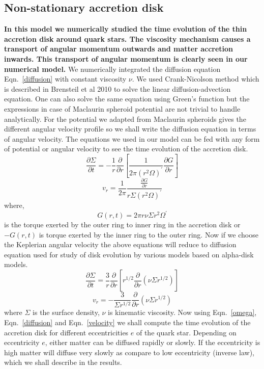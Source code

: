 \documentclass[useAMS,usenatbib]{mn2e}
\begin{document}
\subsection{Non-stationary accretion disk}
\textbf{In this model we numerically studied the time evolution of the thin accretion disk around quark stars. The viscosity mechanism causes a transport of angular momentum outwards and matter accretion inwards. This transport of angular momentum is clearly seen in our numerical model.} We numerically integrated the diffusion equation Eqn.~\ref{diffusion} with constant viscosity $\nu$. We used Crank-Nicolson method which is described in Brensteil et al 2010 to solve the linear diffusion-advection equation. One can also solve the same equation using Green's function but the expressions in case of Maclaurin spheroid potential are not trivial to handle analytically. For the potential we adapted from Maclaurin spheroids gives the different angular velocity profile so we shall write the diffusion equation in terms of angular velocity. The equations we used in our model can be fed with any form of potential or angular velocity to see the time evolution of the accretion disk.
\begin{equation}
\frac{\partial\Sigma}{\partial t} = -\frac{1}{r}\frac{\partial}{\partial r}\left[\frac{1}{2\pi(r^2\Omega)^\prime}\frac{\partial G}{\partial r}\right]
\label{diffusion}
\end{equation}
\begin{equation}
v_r = \frac{1}{2\pi}\frac{\frac{\partial G}{\partial r}}{r\Sigma (r^2\Omega)^\prime}
\label{velocity}
\end{equation}
where,
\begin{equation}
G(r,t) = 2\pi r\nu\Sigma r^2 \Omega^\prime 
\end{equation}
is the torque exerted by the outer ring to inner ring in the accretion disk or $-G(r,t)$ is torque exerted by the inner ring to the outer ring. Now if we choose the Keplerian angular velocity the above equations will reduce to diffusion equation used for study of disk evolution by various models based on alpha-disk models.
\begin{equation}
\frac{\partial\Sigma}{\partial t} = \frac{3}{r}\frac{\partial}{\partial r}\left[r^{1/2}\frac{\partial}{\partial r}\left(\nu\Sigma r^{1/2}\right)\right]
\end{equation}
\begin{equation}
v_r = -\frac{3}{\Sigma r^{1/2}}\frac{\partial}{\partial r}\left(\nu\Sigma r^{1/2}\right)
\end{equation}
where $\Sigma$ is the surface density, $\nu$ is kinematic viscosity. Now using Eqn.~\ref{omega}, Eqn.~\ref{diffusion} and Eqn.~\ref{velocity} we shall compute the time evolution of the accretion disk for different eccentricities $e$ of the quark star. Depending on eccentricity $e$, either matter can be diffused rapidly or slowly. If the eccentricity is high matter will diffuse very slowly as compare to low eccentricity (inverse law), which we shall describe in the results.
\end{document}
